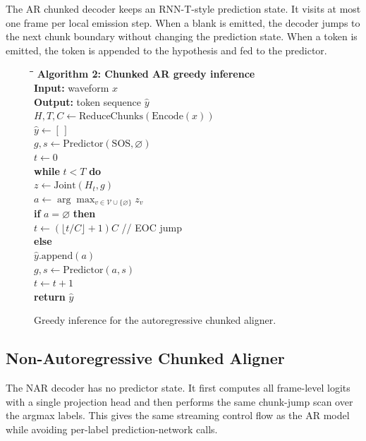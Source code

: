 \documentclass[conference]{IEEEtran}
\newcommand{\blank}{\varnothing}
\begin{document}
The AR chunked decoder keeps an RNN-T-style prediction state. It visits at most
one frame per local emission step. When a blank is emitted, the decoder jumps to
the next chunk boundary without changing the prediction state. When a token is
emitted, the token is appended to the hypothesis and fed to the predictor.

\begin{figure}[t]
\small
\begin{tabbing}
\hspace{0.03in}\=\hspace{0.20in}\=\hspace{0.20in}\=\kill
\textbf{Algorithm 2: Chunked AR greedy inference}\\
\textbf{Input:} waveform $x$\\
\textbf{Output:} token sequence $\hat{y}$\\
$H,T,C \leftarrow \mathrm{ReduceChunks}(\mathrm{Encode}(x))$\\
$\hat{y} \leftarrow [\,]$\\
$g,s \leftarrow \mathrm{Predictor}(\mathrm{SOS}, \varnothing)$\\
$t \leftarrow 0$\\
\textbf{while} $t < T$ \textbf{do}\\
\> $z \leftarrow \mathrm{Joint}(H_t, g)$\\
\> $a \leftarrow \arg\max_{v \in \mathcal{V}\cup\{\blank\}} z_v$\\
\> \textbf{if} $a=\blank$ \textbf{then}\\
\>\> $t \leftarrow (\lfloor t/C \rfloor + 1)C$ \hfill // EOC jump\\
\> \textbf{else}\\
\>\> $\hat{y}.\mathrm{append}(a)$\\
\>\> $g,s \leftarrow \mathrm{Predictor}(a,s)$\\
\>\> $t \leftarrow t+1$\\
\textbf{return} $\hat{y}$
\end{tabbing}
\caption{Greedy inference for the autoregressive chunked aligner.}
\label{alg:chunked-ar}
\end{figure}

\subsection{Non-Autoregressive Chunked Aligner}

The NAR decoder has no predictor state. It first computes all frame-level logits
with a single projection head and then performs the same chunk-jump scan over the
argmax labels. This gives the same streaming control flow as the AR model while
avoiding per-label prediction-network calls.
\end{document}
